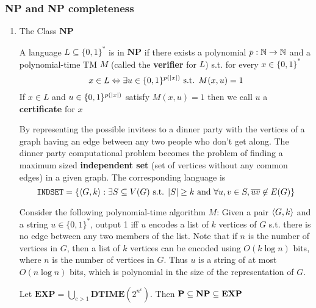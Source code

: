 \documentclass[11pt]{article}
\def \EXP {\textbf{EXP}}
\def \NP {\textbf{NP}}
\def \DTIME {\textbf{DTIME}}
\def \NP {\textbf{NP}}
\def \INDSET {\texttt{INDSET}}
\begin{document}
\subsubsection{NP and NP completeness}
\label{sec:org434f3c9}

\begin{enumerate}
\item The Class \(\NP\)
\label{sec:org62cb4f3}
\index{$\NP$}
\begin{definition}[]
A language \(L\subseteq\{0,1\}^*\) is in \(\NP\) if there exists  a polynomial \(p:\mathbb{N}\to\mathbb{N}\)
and a polynomial-time TM \(M\) (called the \textbf{verifier} for \(L\)) s.t. for
every \(x\in\{0,1\}^*\)
     \begin{equation*}
x\in L\Leftrightarrow \exists u\in\{0,1\}^{p(\abs{x})}\text{ s.t. }M(x,u)=1
     \end{equation*}
If \(x\in L\) and \(u\in\{0,1\}^{p(\abs{x})}\) satisfy \(M(x,u)=1\) then we call \(u\) a
\textbf{certificate} for \(x\)
\end{definition}

\begin{examplle}[\(\INDSET\in\NP\)]
By representing the possible invitees to a dinner party with the vertices of a graph having an
edge between any two people who don't get along. The dinner party computational problem becomes
the problem of finding a maximum sized \textbf{independent set} (set of vertices without any common
edges) in a given graph. The corresponding language is
     \begin{equation*}
\INDSET=\{\la G,k\ra:\exists S\subseteq V(G)\text{ s.t. }\abs{S}\ge k\text{ and }\forall u,v\in S, \ove{uv}\not\in E(G)\}
     \end{equation*}

Consider the following polynomial-time algorithm \(M\): Given a pair \(\langle G,k\rangle\) and a
string \(u\in\{0,1\}^*\), output 1 iff \(u\) encodes a list of \(k\) vertices of \(G\) s.t.
there is no edge between any two members of the list. Note that if \(n\) is the number of
vertices in \(G\), then a list of \(k\) vertices can be encoded using \(O(k\log n)\) bits,
where \(n\) is the number of vertices in \(G\). Thus \(u\) is a string of at
most \(O(n\log n)\) bits, which is polynomial in the size of the representation of \(G\).
\end{examplle}

\begin{proposition}[]
Let \(\EXP=\bigcup_{c>1}\DTIME(2^{n^c})\). Then \(\bP\subseteq\NP\subseteq\EXP\)
\end{proposition}


\end{enumerate}
\end{document}
